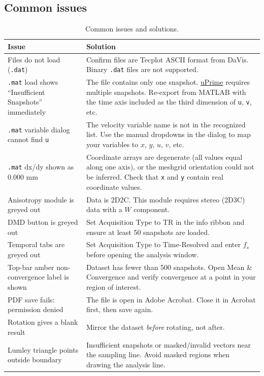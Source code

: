 \subsection{Common issues}

\begin{table}[htbp]
\centering
\caption{Common issues and solutions.}
\begin{tabular}{p{5.2cm}p{8.8cm}}
\toprule
\textbf{Issue} & \textbf{Solution} \\
\midrule
Files do not load (\texttt{.dat}) & Confirm files are Tecplot ASCII format from DaVis. Binary \texttt{.dat} files are not supported. \\
\texttt{.mat} load shows ``Insufficient Snapshots'' immediately & The file contains only one snapshot. \href{https://cmdrryder.github.io/uPrime/}{uPrime} requires multiple snapshots. Re-export from MATLAB with the time axis included as the third dimension of \texttt{u}, \texttt{v}, etc. \\
\texttt{.mat} variable dialog cannot find \texttt{u} & The velocity variable name is not in the recognized list. Use the manual dropdowns in the dialog to map your variables to $x$, $y$, $u$, $v$, etc. \\
\texttt{.mat} dx/dy shown as 0.000 mm & Coordinate arrays are degenerate (all values equal along one axis), or the meshgrid orientation could not be inferred. Check that \texttt{x} and \texttt{y} contain real coordinate values. \\
Anisotropy module is greyed out & Data is 2D2C. This module requires stereo (2D3C) data with a $W$ component. \\
DMD button is greyed out & Set Acquisition Type to TR in the info ribbon and ensure at least 50 snapshots are loaded. \\
Temporal tabs are greyed out & Set Acquisition Type to Time-Resolved and enter $f_s$ before opening the analysis window. \\
Top-bar amber non-convergence label is shown & Dataset has fewer than 500 snapshots. Open Mean \& Convergence and verify convergence at a point in your region of interest. \\
PDF save fails: permission denied & The file is open in Adobe Acrobat. Close it in Acrobat first, then save again. \\
Rotation gives a blank result & Mirror the dataset \emph{before} rotating, not after. \\
Lumley triangle points outside boundary & Insufficient snapshots or masked/invalid vectors near the sampling line. Avoid masked regions when drawing the analysis line. \\

\end{tabular}
\end{table}
